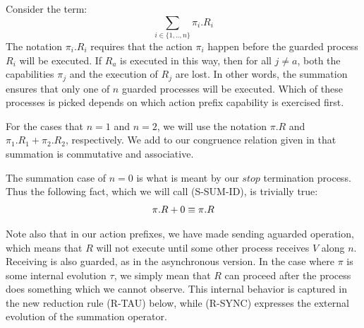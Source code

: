 Consider the term:
\[
	\sum_{i\in \{1,..,n\}} \pi_i.R_i
\]
The notation $\pi_i.R_i$ requires that the action $\pi_i$ happen before the guarded process $R_i$ will be executed.  If $R_a$ is executed in this way, then for all $j \neq a$, both the capabilities $\pi_j$ and the execution of $R_j$ are lost.  In other words, the summation ensures that only one of $n$ guarded processes will be executed. Which of these processes is picked depends on which action prefix capability is exercised first. 

For the cases that $n=1$ and $n=2$, we will use the notation $\pi.R$ and $\pi_1.R_1 + \pi_2.R_2$, respectively.  We add to our congruence relation given in  that summation is commutative and associative.

The summation case of $n=0$ is what is meant by our $stop$ termination process.  Thus the following fact, which we will call (S-SUM-ID), is trivially true:
\begin{align*}
	\pi.R + 0 \equiv \pi.R
\end{align*}

Note also that in our action prefixes, we have made sending aguarded operation, which means that $R$ will not execute until some other process receives $V$ along $n$.   Receiving is also guarded, as in the asynchronous version.  In the case where $\pi$ is some internal evolution $\tau$, we simply mean that $R$ can proceed after the process does something which we cannot observe.  This internal behavior is captured in the new reduction rule (R-TAU) below, while (R-SYNC) expresses the external evolution of the summation operator.


